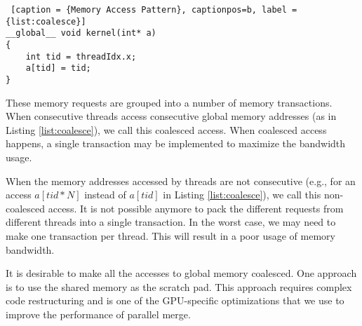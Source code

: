     \begin{minipage}{\linewidth}
    \begin{singlespace}
    \begin{lstlisting} [caption = {Memory Access Pattern}, captionpos=b, label = {list:coalesce}]
__global__ void kernel(int* a) 
{
    int tid = threadIdx.x;
    a[tid] = tid;
}
    \end{lstlisting}
    \end{singlespace}
    \end{minipage}

    These memory requests are grouped into a number of memory transactions. 
    When consecutive threads access consecutive global memory addresses 
    (as in Listing \ref{list:coalesce}), we call this coalesced access. 
    When coalesced access happens, a single transaction may be implemented \cite{cgo_arch} 
    to maximize the bandwidth usage.

    When the memory addresses accessed by threads are not consecutive 
    (e.g., for an access $a[tid * N]$ instead of $a[tid]$ in Listing \ref{list:coalesce}), 
    we call this non-coalesced access. 
    It is not possible anymore to pack the different requests from different threads 
    into a single transaction. In the worst case, we may need to make one transaction 
    per thread. This will result in a poor usage of memory bandwidth. 
    
    It is desirable to make all the accesses to global memory coalesced. One approach is to 
    use the shared memory as the scratch pad. This approach requires complex code 
    restructuring and is one of the GPU-specific optimizations that we use to improve the 
    performance of parallel merge. 

